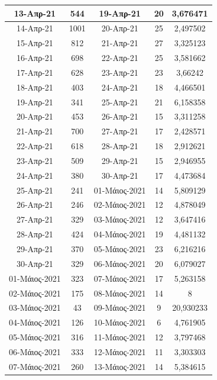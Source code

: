 \documentclass{article}
\begin{document}
\begin{table}
{\begin{tabular}{|c|c|c|c|c|}
                13-Απρ-21 & 544 & 19-Απρ-21 & 20 & 3,676471 \\ \hline
                14-Απρ-21 & 1001 & 20-Απρ-21 & 25 & 2,497502 \\ \hline
                15-Απρ-21 & 812 & 21-Απρ-21 & 27 & 3,325123 \\ \hline
                16-Απρ-21 & 698 & 22-Απρ-21 & 25 & 3,581662 \\ \hline
                17-Απρ-21 & 628 & 23-Απρ-21 & 23 & 3,66242 \\ \hline
                18-Απρ-21 & 403 & 24-Απρ-21 & 18 & 4,466501 \\ \hline
                19-Απρ-21 & 341 & 25-Απρ-21 & 21 & 6,158358 \\ \hline
                20-Απρ-21 & 453 & 26-Απρ-21 & 15 & 3,311258 \\ \hline
                21-Απρ-21 & 700 & 27-Απρ-21 & 17 & 2,428571 \\ \hline
                22-Απρ-21 & 618 & 28-Απρ-21 & 18 & 2,912621 \\ \hline
                23-Απρ-21 & 509 & 29-Απρ-21 & 15 & 2,946955 \\ \hline
                24-Απρ-21 & 380 & 30-Απρ-21 & 17 & 4,473684 \\ \hline
                25-Απρ-21 & 241 & 01-Μάιος-2021 & 14 & 5,809129 \\ \hline
                26-Απρ-21 & 246 & 02-Μάιος-2021 & 12 & 4,878049 \\ \hline
                27-Απρ-21 & 329 & 03-Μάιος-2021 & 12 & 3,647416 \\ \hline
                28-Απρ-21 & 424 & 04-Μάιος-2021 & 19 & 4,481132 \\ \hline
                29-Απρ-21 & 370 & 05-Μάιος-2021 & 23 & 6,216216 \\ \hline
                30-Απρ-21 & 329 & 06-Μάιος-2021 & 20 & 6,079027 \\ \hline
                01-Μάιος-2021 & 323 & 07-Μάιος-2021 & 17 & 5,263158 \\ \hline
                02-Μάιος-2021 & 175 & 08-Μάιος-2021 & 14 & 8 \\ \hline
                03-Μάιος-2021 & 43 & 09-Μάιος-2021 & 9 & 20,930233 \\ \hline
                04-Μάιος-2021 & 126 & 10-Μάιος-2021 & 6 & 4,761905 \\ \hline
                05-Μάιος-2021 & 316 & 11-Μάιος-2021 & 12 & 3,797468 \\ \hline
                06-Μάιος-2021 & 333 & 12-Μάιος-2021 & 11 & 3,303303 \\ \hline
                07-Μάιος-2021 & 260 & 13-Μάιος-2021 & 14 & 5,384615 \\ \hline
            \end{tabular}%
            }
        \end{table}
        
\end{document}
